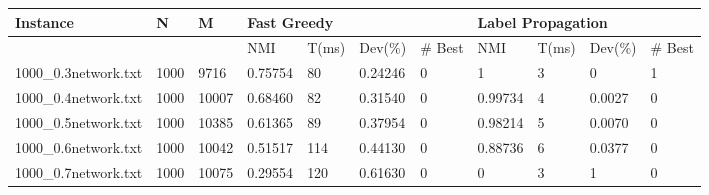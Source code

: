 \begin{sidewaystable}
\begin{tabular}{lllllllllll}
	\end{tabular}
	\begin{tabular}{lllllllllll}
		\hline
		\multicolumn{1}{|l|}{Instance}             & \multicolumn{1}{l|}{N}    & \multicolumn{1}{l|}{M}     & \multicolumn{4}{l|}{Fast Greedy}                                                                                        & \multicolumn{4}{l|}{Label Propagation}                                                                                  \\ \hline
		\multicolumn{1}{|l|}{}                     & \multicolumn{1}{l|}{}     & \multicolumn{1}{l|}{}      & \multicolumn{1}{l|}{NMI}     & \multicolumn{1}{l|}{T(ms)} & \multicolumn{1}{l|}{Dev(\%)} & \multicolumn{1}{l|}{\# Best} & \multicolumn{1}{l|}{NMI}     & \multicolumn{1}{l|}{T(ms)} & \multicolumn{1}{l|}{Dev(\%)} & \multicolumn{1}{l|}{\# Best} \\ \hline
		\multicolumn{1}{|l|}{1000\_0.3network.txt} & \multicolumn{1}{l|}{1000} & \multicolumn{1}{l|}{9716}  & \multicolumn{1}{l|}{0.75754} & \multicolumn{1}{l|}{80}    & \multicolumn{1}{l|}{0.24246} & \multicolumn{1}{l|}{0}       & \multicolumn{1}{l|}{1}       & \multicolumn{1}{l|}{3}     & \multicolumn{1}{l|}{0}       & \multicolumn{1}{l|}{1}       \\ \hline
		\multicolumn{1}{|l|}{1000\_0.4network.txt} & \multicolumn{1}{l|}{1000} & \multicolumn{1}{l|}{10007} & \multicolumn{1}{l|}{0.68460} & \multicolumn{1}{l|}{82}    & \multicolumn{1}{l|}{0.31540} & \multicolumn{1}{l|}{0}       & \multicolumn{1}{l|}{0.99734} & \multicolumn{1}{l|}{4}     & \multicolumn{1}{l|}{0.0027}  & \multicolumn{1}{l|}{0}       \\ \hline
		\multicolumn{1}{|l|}{1000\_0.5network.txt} & \multicolumn{1}{l|}{1000} & \multicolumn{1}{l|}{10385} & \multicolumn{1}{l|}{0.61365} & \multicolumn{1}{l|}{89}    & \multicolumn{1}{l|}{0.37954} & \multicolumn{1}{l|}{0}       & \multicolumn{1}{l|}{0.98214} & \multicolumn{1}{l|}{5}     & \multicolumn{1}{l|}{0.0070}  & \multicolumn{1}{l|}{0}       \\ \hline
		\multicolumn{1}{|l|}{1000\_0.6network.txt} & \multicolumn{1}{l|}{1000} & \multicolumn{1}{l|}{10042} & \multicolumn{1}{l|}{0.51517} & \multicolumn{1}{l|}{114}   & \multicolumn{1}{l|}{0.44130} & \multicolumn{1}{l|}{0}       & \multicolumn{1}{l|}{0.88736} & \multicolumn{1}{l|}{6}     & \multicolumn{1}{l|}{0.0377}  & \multicolumn{1}{l|}{0}       \\ \hline
		\multicolumn{1}{|l|}{1000\_0.7network.txt} & \multicolumn{1}{l|}{1000} & \multicolumn{1}{l|}{10075} & \multicolumn{1}{l|}{0.29554} & \multicolumn{1}{l|}{120}   & \multicolumn{1}{l|}{0.61630} & \multicolumn{1}{l|}{0}       & \multicolumn{1}{l|}{0}       & \multicolumn{1}{l|}{3}     & \multicolumn{1}{l|}{1}       & \multicolumn{1}{l|}{0}       \\ \hline

\end{tabular}
\end{sidewaystable}
